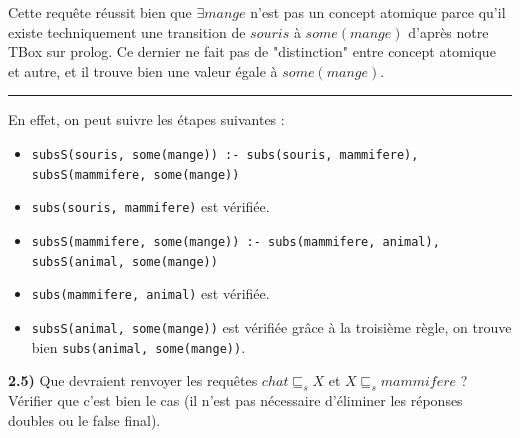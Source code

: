 \documentclass[a4paper,12pt]{report}
\begin{document}
\begin{tcolorbox}[colback=gray!10, colframe=blue!30, coltitle=black, title=Réponse à la question 2.4 - 1/1]

    Cette requête réussit bien que \(\exists mange\) n'est pas un concept atomique parce qu'il existe techniquement une transition de \(souris\) à \(some(mange)\)
        d'après notre TBox sur prolog. Ce dernier ne fait pas de "distinction" entre concept atomique et autre, et il trouve bien une valeur égale à \(some(mange)\).

    \vspace{0.5cm}
    \hrule
    \vspace{0.5cm}
        
    En effet, on peut suivre les étapes suivantes :\\[-0.4cm]
    \begin{itemize}
        \item \texttt{subsS(souris, some(mange)) :- subs(souris, mammifere), subsS(mammifere, some(mange))}\\[-0.2cm]
        \item \texttt{subs(souris, mammifere)} est vérifiée.
        \item \texttt{subsS(mammifere, some(mange)) :- subs(mammifere, animal), subsS(animal, some(mange))}\\[-0.2cm]
        \item \texttt{subs(mammifere, animal)} est vérifiée.
        \item \texttt{subsS(animal, some(mange))} est vérifiée grâce à la troisième règle, on trouve bien \texttt{subs(animal, some(mange))}.
    \end{itemize}

\end{tcolorbox}




\newpage

{}

\textbf{2.5)} Que devraient renvoyer les requêtes \(chat \sqsubseteq_s X\) et \(X \sqsubseteq_s mammifere\) ? Vérifier que c'est bien le cas (il n'est pas nécessaire
    d'éliminer les réponses doubles ou le false final).
\end{document}
